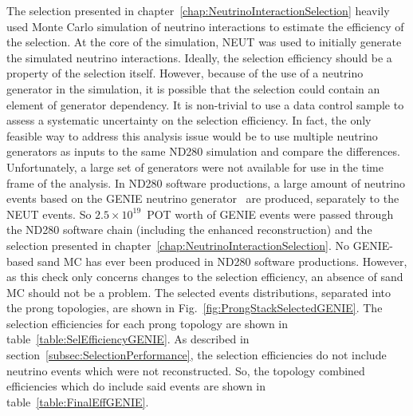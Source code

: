 The selection presented in chapter~\ref{chap:NeutrinoInteractionSelection} heavily used Monte Carlo simulation of neutrino interactions to estimate the efficiency of the selection.  At the core of the simulation, NEUT was used to initially generate the simulated neutrino interactions.  Ideally, the selection efficiency should be a property of the selection itself.  However, because of the use of a neutrino generator in the simulation, it is possible that the selection could contain an element of generator dependency.  It is non-trivial to use a data control sample to assess a systematic uncertainty on the selection efficiency.  In fact, the only feasible way to address this analysis issue would be to use multiple neutrino generators as inputs to the same ND280 simulation and compare the differences.  Unfortunately, a large set of generators were not available for use in the time frame of the analysis.  In ND280 software productions, a large amount of neutrino events based on the GENIE neutrino generator~\cite{Andreopoulos201087} are produced, separately to the NEUT events.  So $2.5\times 10^{19}$~POT worth of GENIE events were passed through the ND280 software chain (including the enhanced reconstruction) and the selection presented in chapter~\ref{chap:NeutrinoInteractionSelection}.  No GENIE-based sand MC has ever been produced in ND280 software productions.  However, as this check only concerns changes to the selection efficiency, an absence of sand MC should not be a problem.  
\newline
\newline
The selected events distributions, separated into the prong topologies, are shown in Fig.~\ref{fig:ProngStackSelectedGENIE}.  The selection efficiencies for each prong topology are shown in table~\ref{table:SelEfficiencyGENIE}.  As described in section~\ref{subsec:SelectionPerformance}, the selection efficiencies do not include neutrino events which were not reconstructed.  So, the topology combined efficiencies which do include said events are shown in table~\ref{table:FinalEffGENIE}.
